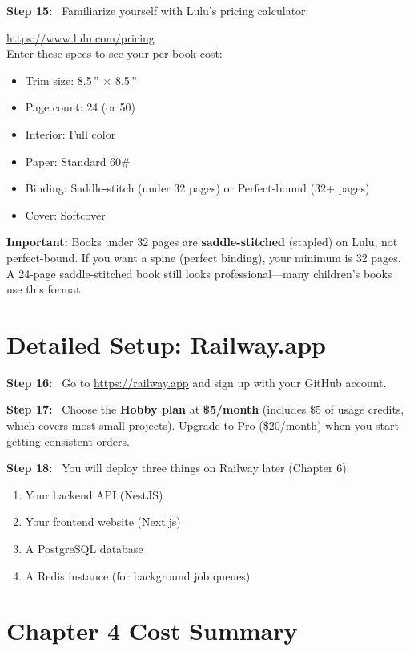\documentclass[12pt, letterpaper, oneside]{book}
\newcommand{\cost}[1]{\textcolor{money}{\textbf{#1}}}
\newcommand{\step}[1]{\noindent\textbf{\textcolor{primary}{Step #1:}}~}
\begin{document}
\step{15} Familiarize yourself with Lulu's pricing calculator:
\begin{actionbox}
\url{https://www.lulu.com/pricing}\\[4pt]
Enter these specs to see your per-book cost:
\begin{itemize}[leftmargin=1.5em]
  \item Trim size: 8.5\,'' $\times$ 8.5\,''
  \item Page count: 24 (or 50)
  \item Interior: Full color
  \item Paper: Standard 60\#
  \item Binding: Saddle-stitch (under 32 pages) or Perfect-bound (32+ pages)
  \item Cover: Softcover
\end{itemize}
\end{actionbox}

\begin{infobox}
\textbf{Important:} Books under 32 pages are \textbf{saddle-stitched} (stapled) on Lulu, not perfect-bound. If you want a spine (perfect binding), your minimum is 32 pages. A 24-page saddle-stitched book still looks professional---many children's books use this format.
\end{infobox}

\section{Detailed Setup: Railway.app}

\step{16} Go to \url{https://railway.app} and sign up with your GitHub account.

\step{17} Choose the \textbf{Hobby plan} at \cost{\$5/month} (includes \$5 of usage credits, which covers most small projects). Upgrade to Pro (\$20/month) when you start getting consistent orders.

\step{18} You will deploy three things on Railway later (Chapter 6):
\begin{enumerate}[leftmargin=2em]
  \item Your backend API (NestJS)
  \item Your frontend website (Next.js)
  \item A PostgreSQL database
  \item A Redis instance (for background job queues)
\end{enumerate}

\section{Chapter 4 Cost Summary}
\end{document}
